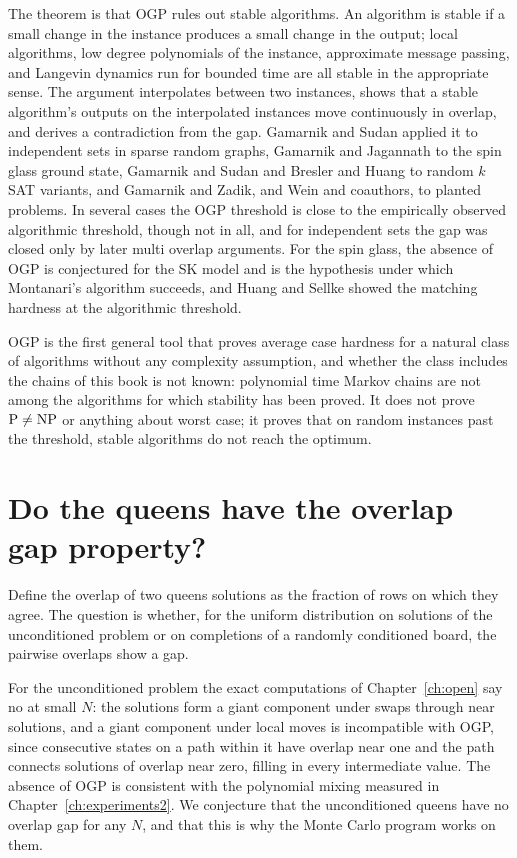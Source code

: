 The theorem is that OGP rules out stable algorithms. An algorithm is stable if a small change in the instance produces a small change in the output; local algorithms, low degree polynomials of the instance, approximate message passing, and Langevin dynamics run for bounded time are all stable in the appropriate sense. The argument interpolates between two instances, shows that a stable algorithm's outputs on the interpolated instances move continuously in overlap, and derives a contradiction from the gap. Gamarnik and Sudan applied it to independent sets in sparse random graphs, Gamarnik and Jagannath to the spin glass ground state, Gamarnik and Sudan and Bresler and Huang to random $k$ SAT variants, and Gamarnik and Zadik, and Wein and coauthors, to planted problems. In several cases the OGP threshold is close to the empirically observed algorithmic threshold, though not in all, and for independent sets the gap was closed only by later multi overlap arguments. For the spin glass, the absence of OGP is conjectured for the SK model and is the hypothesis under which Montanari's algorithm succeeds, and Huang and Sellke showed the matching hardness at the algorithmic threshold.

OGP is the first general tool that proves average case hardness for a natural class of algorithms without any complexity assumption, and whether the class includes the chains of this book is not known: polynomial time Markov chains are not among the algorithms for which stability has been proved. It does not prove $\mathrm{P} \neq \mathrm{NP}$ or anything about worst case; it proves that on random instances past the threshold, stable algorithms do not reach the optimum.

\section{Do the queens have the overlap gap property?}

Define the overlap of two queens solutions as the fraction of rows on which they agree. The question is whether, for the uniform distribution on solutions of the unconditioned problem or on completions of a randomly conditioned board, the pairwise overlaps show a gap.

For the unconditioned problem the exact computations of Chapter~\ref{ch:open} say no at small $N$: the solutions form a giant component under swaps through near solutions, and a giant component under local moves is incompatible with OGP, since consecutive states on a path within it have overlap near one and the path connects solutions of overlap near zero, filling in every intermediate value. The absence of OGP is consistent with the polynomial mixing measured in Chapter~\ref{ch:experiments2}. We conjecture that the unconditioned queens have no overlap gap for any $N$, and that this is why the Monte Carlo program works on them.

